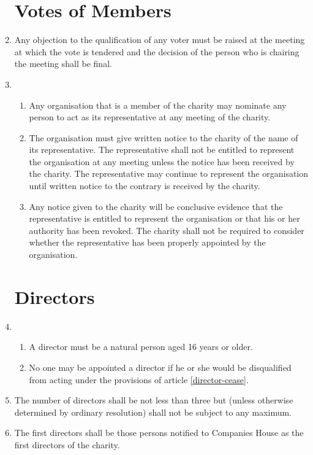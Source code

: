 \begin{enumerate}
\section{Votes of Members}

\item
  Any objection to the qualification of any voter must be raised at
  the meeting at which the vote is tendered and the decision of the
  person who is chairing the meeting shall be final.
\item
  \begin{enumerate}
  \item
    Any organisation that is a member of the charity may nominate any
    person to act as its representative at any meeting of the charity.
  \item
    The organisation must give written notice to the charity of the
    name of its representative. The representative shall not be
    entitled to represent the organisation at any meeting unless the
    notice has been received by the charity. The representative may
    continue to represent the organisation until written notice to the
    contrary is received by the charity.
  \item
    Any notice given to the charity will be conclusive evidence that
    the representative is entitled to represent the organisation or
    that his or her authority has been revoked. The charity shall not
    be required to consider whether the representative has been
    properly appointed by the organisation.
  \end{enumerate}

\section{Directors}

\item
  \begin{enumerate}
  \item
    A director must be a natural person aged 16 years or older.
  \item
    No one may be appointed a director if he or she would be
    disqualified from acting under the provisions of article \ref{director-cease}.
  \end{enumerate}
\item
  The number of directors shall be not less than three but (unless
  otherwise determined by ordinary resolution) shall not be subject
  to any maximum.

\item
  The first directors shall be those persons notified to Companies
  House as the first directors of the charity.


\end{enumerate}
